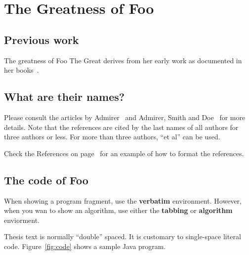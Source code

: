 \documentclass{bsu-ms}
\begin{document}
%
%

\chapter{The Greatness of Foo}\label{ch:fooGreatness}

\section{Previous work}
The greatness of Foo The Great derives from her early work as documented in
her books~\cite{foo:book1,foo:book2}.

\section{What are their names?}
Please consult the articles by Admirer~\cite{me:paper1} and Admirer,
Smith and Doe~\cite{me:paper2} for more details. Note that the references are
cited by the last names of all authors for three authors or less. For more
than three authors, ``et al'' can be used. 

Check the References on page~\pageref{references} for an example of how to
format the references. 

\section{The code of Foo}

When showing a program fragment, use the \textbf{verbatim}
environment. However, when you wan to show an algorithm, use either the
\textbf{tabbing} or \textbf{algorithm} enviorment.

Thesis text is normally ``double'' spaced.  It is customary to single-space
literal code.  Figure~\ref{fig:code} shows a sample Java program.
\end{document}
